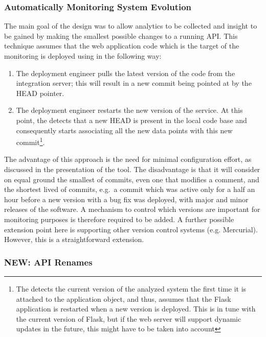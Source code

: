   \subsubsection{Automatically Monitoring System Evolution}

  The main goal of the \tool design was to allow analytics to be collected and insight to be gained by making the smallest possible changes to a running API. %
%
  This technique assumes that the web application code which is the target of the monitoring is deployed using \git in the following way: 

  \begin{enumerate}
    \item The deployment engineer pulls the latest version of the code from the integration server; this will result in a new commit being pointed at by the HEAD pointer. %
    \item The deployment engineer restarts the new version of the service. At this point, the \tool detects that a new HEAD is present in the local code base and consequently starts associating all the new data points with this new commit\footnote{The \tool detects the current version of the analyzed system the first time it is attached to the application object, and thus, assumes that the Flask application is restarted when a new version is deployed. This is in tune with the current version of Flask, but if the web server will support dynamic updates in the future, this might have to be taken into account}.
  \end{enumerate}

  The advantage of this approach is the need for minimal configuration effort, as discussed in the presentation of the tool. The disadvantage is that it will consider on equal ground the smallest of commits, even one that modifies a comment, and the shortest lived of commits, e.g.~a commit which was active only for a half an hour before a new version with a bug fix was deployed, with major and minor releases of the software. %
  A mechanism to control which versions are important for monitoring purposes is therefore required to be added.
%
  A further possible extension point here is supporting other version control systems (e.g. Mercurial). However, this is a straightforward extension.

  \subsubsection{NEW: API Renames}



